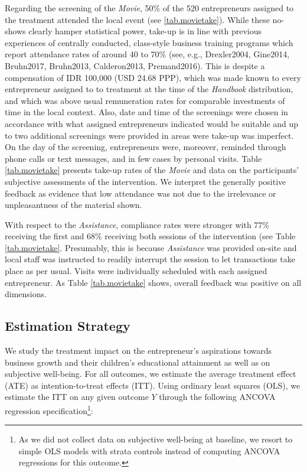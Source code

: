 \documentclass[11.5pt]{article}
\begin{document}
{Regarding the screening of the \emph{Movie}, 50\% of the 520 entrepreneurs assigned to the treatment attended the local event (see \ref{tab.movietake}). While these no-shows clearly hamper statistical power, take-up is in line with previous experiences of centrally conducted, class-style business training programs which report attendance rates of around 40 to 70\% (see, e.g., Drexler2004, Gine2014, Bruhn2017, Bruhn2013, Calderon2013, Premand2016). This is despite a compensation of IDR 100,000 (USD 24.68 PPP), which was made known to every entrepreneur assigned to to treatment at the time of the \emph{Handbook} distribution, and which was above usual remuneration rates for comparable investments of time in the local context. Also, date and time of the screenings were chosen in accordance with what assigned entrepreneurs indicated would be suitable and up to two additional screenings were provided in areas were take-up was imperfect. On the day of the screening, entrepreneurs were, moreover, reminded through phone calls or text messages, and in few cases by personal visits. Table \ref{tab.movietake} presents take-up rates of the \emph{Movie} and data on the participants' subjective assessments of the intervention. We interpret the generally positive feedback as evidence that low attendance was not due to the irrelevance or unpleasantness of the material shown.

With respect to the \emph{Assistance}, compliance rates were stronger with 77\% receiving the first and 68\% receiving both sessions of the intervention (see Table \ref{tab.movietake}. Presumably, this is because \emph{Assistance} was provided on-site and local staff was instructed to readily interrupt the session to let transactions take place as per usual. Visits were individually scheduled with each assigned entrepreneur. As Table \ref{tab.movietake} shows, overall feedback was positive on all dimensions.

\subsection{Estimation Strategy}

We study the treatment impact on the entrepreneur's aspirations towards business growth and their children's educational attainment as well as on subjective well-being. For all outcomes, we estimate the average treatment effect (ATE) as intention-to-treat effects (ITT). Using ordinary least squares (OLS), we estimate the ITT on any given outcome $Y$ through the following ANCOVA regression specification\footnote{As we did not collect data on subjective well-being at baseline, we resort to simple OLS models with strata controls instead of computing ANCOVA regressions for this outcome.}:

}
\end{document}
